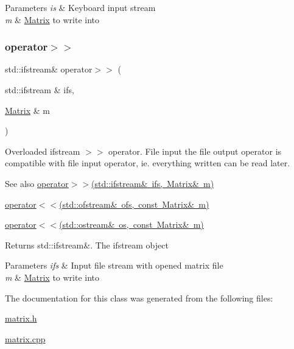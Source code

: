 \begin{DoxyParams}{Parameters}
{\em is} & Keyboard input stream \\
\hline
{\em m} & \mbox{\hyperlink{class_matrix}{Matrix}} to write into \\
\hline
\end{DoxyParams}
\mbox{\label{class_matrix_aa5699a0bdf0ee014f083ff8a76629d21}} 
\subsubsection{\texorpdfstring{operator$>$$>$}{operator>>}\hspace{0.1cm}{\footnotesize\ttfamily [2/2]}}
{\footnotesize\ttfamily std\+::ifstream\& operator$>$$>$ (\begin{DoxyParamCaption}\item[{std\+::ifstream \&}]{ifs,  }\item[{\mbox{\hyperlink{class_matrix}{Matrix}} \&}]{m }\end{DoxyParamCaption})\hspace{0.3cm}{\ttfamily [friend]}}

Overloaded ifstream $>$$>$ operator. File input the file output operator is compatible with file input operator, ie. everything written can be read later. \begin{DoxySeeAlso}{See also}
\mbox{\hyperlink{class_matrix_aa5699a0bdf0ee014f083ff8a76629d21}{operator$>$$>$(std\+::ifstream\& ifs, Matrix\& m)}} 

\mbox{\hyperlink{class_matrix_aa574249d63b390cf1108d6e82047ef61}{operator$<$$<$(std\+::ofstream\& ofs, const Matrix\& m)}} 

\mbox{\hyperlink{class_matrix_a060711074cb5bcaf4e75498bc040c4b7}{operator$<$$<$(std\+::ostream\& os, const Matrix\& m)}} 
\end{DoxySeeAlso}
\begin{DoxyReturn}{Returns}
std\+::ifstream\&. The ifstream object 
\end{DoxyReturn}

\begin{DoxyParams}{Parameters}
{\em ifs} & Input file stream with opened matrix file \\
\hline
{\em m} & \mbox{\hyperlink{class_matrix}{Matrix}} to write into \\
\hline
\end{DoxyParams}


The documentation for this class was generated from the following files\+:\begin{DoxyCompactItemize}
\item 
\mbox{\hyperlink{matrix_8h}{matrix.\+h}}\item 
\mbox{\hyperlink{matrix_8cpp}{matrix.\+cpp}}\end{DoxyCompactItemize}

